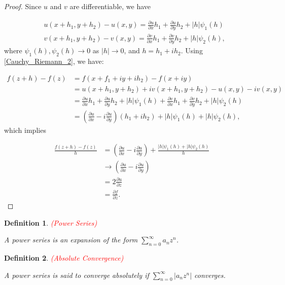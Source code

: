\documentclass{article}
\newtheorem{definition}{Definition}
\begin{document}
\begin{proof}
Since $u$ and $v$ are differentiable, we have 

\begin{equation*}
\begin{aligned}
&u(x+h_1,y+h_2)-u(x,y)=\frac{\partial u}{\partial x}h_1+\frac{\partial u}{\partial y}h_2+|h|\psi_1(h)\\
&v(x+h_1,y+h_2)-v(x,y)=\frac{\partial v}{\partial x}h_1+\frac{\partial v}{\partial y}h_2+|h|\psi_2(h),
\end{aligned}
\end{equation*}
where $\psi_1(h),\psi_2(h)\rightarrow0$ as $|h|\rightarrow0$, and $h=h_1+ih_2$. Using \eqref{Cauchy_Riemann_2}, we have:

\begin{equation*}
\begin{aligned}
f(z+h)-f(z)&=f(x+f_1+iy+ih_2)-f(x+iy)\\
&=u(x+h_1,y+h_2)+iv(x+h_1,y+h_2)-u(x,y)-iv(x,y)\\
&=\frac{\partial u}{\partial x}h_1+\frac{\partial u}{\partial y}h_2+|h|\psi_1(h)+\frac{\partial v}{\partial x}h_1+\frac{\partial v}{\partial y}h_2+|h|\psi_2(h)\\
&=\left(\frac{\partial u}{\partial x}-i\frac{\partial u}{\partial y}\right)(h_1+ih_2)+|h|\psi_1(h)+|h|\psi_2(h),
\end{aligned}
\end{equation*}
which implies

\begin{equation*}
\begin{aligned}
\frac{f(z+h)-f(z)}{h}&=\left(\frac{\partial u}{\partial x}-i\frac{\partial u}{\partial y}\right)+\frac{|h|\psi_1(h)+|h|\psi_2(h)}{h}\\
&\rightarrow\left(\frac{\partial u}{\partial x}-i\frac{\partial u}{\partial y}\right)\\
&=2\frac{\partial u}{\partial z}\\
&=\frac{\partial f}{\partial z}.
\end{aligned}
\end{equation*}
\end{proof}

\begin{definition} \textcolor{red}{(Power Series)}

A power series is an expansion of the form $\sum^\infty_{n=0}a_nz^n$.
\end{definition}

\begin{definition} \textcolor{red}{(Absolute Convergence)}

A power series is said to converge absolutely if $\sum^\infty_{n=0}|a_nz^n|$ converges.
\end{definition}
\end{document}
